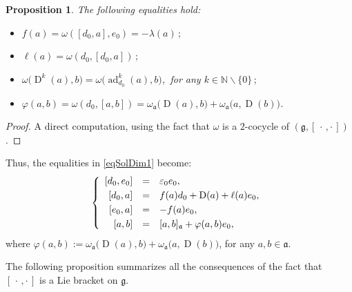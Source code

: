 \documentclass[final,1p,times,nopreprintline]{elsarticle}
\newtheorem{proposition}{Proposition}[section]
\theoremstyle{definition}
\numberwithin{equation}{section}
\newcommand{\nat}{\mathbb{N}}
\newcommand{\w}{\omega}
\newcommand{\g}{\mathfrak{g}}
\newcommand{\ai}{\mathfrak{a}}
\newcommand{\ad}{\operatorname{ad}}
\numberwithin{equation}{section}
\newcommand{\D}{\operatorname{D}}
\newcommand{\cro}{[\,\cdot\,,\cdot\,]}
\begin{document}
\begin{proposition}
	The following equalities hold:
	\begin{itemize}
		\item[$1.$] $f(a)=\w([d_0,a],e_0)=-\lambda(a)\,;$\vspace{1mm}
		\item[$2.$] $\ell(a)=\w(d_0,[d_0,a])\,;$\vspace{1mm}
		\item[$3.$] $\w\big(\D^k(a),b\big)=\w\big(\ad_{d_0}^k(a),b\big)$,\, for any $k\in\nat\backslash\{0\}\,;$\vspace{1mm}
		\item[$4.$] $\varphi(a,b)=\w(d_0,[a,b])=\w_\ai\big(\D(a),b\big)+\w_\ai\big(a,\D(b)\big)$.\vspace{1mm}
	\end{itemize}
\end{proposition}

\begin{proof}
	A direct computation, using the fact that $\w$ is a $2$-cocycle of $(\g,\cro)$.
\end{proof}
Thus, the equalities in \eqref{eqSolDim1} become:
\begin{equation}\label{eqSolDim1II}
	\left\{
	\begin{array}{r c l}\vspace{1mm}
		\left[d_0,e_0\right]&=&\varepsilon_0e_0,\\\vspace{1mm}
		\left[d_0,a\right]&=&f(a)d_0+\D(a)+\ell(a)e_0,\\ \vspace{1mm}
		\left[e_0,a\right]&=&-f(a)e_0,\hfill\\
		\left[a,b\right]&=&[a,b]_\ai+\varphi(a,b)e_0,\hfill
	\end{array}
	\right.\\
\end{equation}
where $\varphi(a,b):=\w_\ai\big(\D(a),b\big)+\w_\ai\big(a,\D(b)\big)$, for any $a,b\in\ai$.\vspace{2mm}

The following proposition summarizes all the consequences of the fact that $[\,\cdot\,,\cdot\,]$ is a Lie bracket on $\g$.
\end{document}
